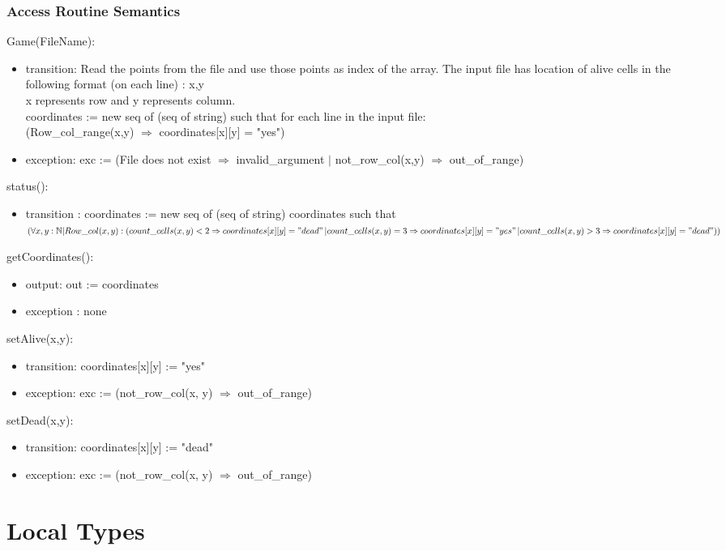 \documentclass[12pt]{article}
\begin{document}
\subsubsection* {Access Routine Semantics}
Game(FileName):
\begin{itemize}
    \item transition: Read the points from the file and use those points as index of the array. The input file has location of alive cells in the following format (on each line) : x,y \\x represents row and y represents column.\\
    coordinates := new seq of (seq of string) such that for each line in the input file:\\
(Row\_col\_range(x,y) $\Rightarrow$ coordinates[x][y] = "yes")\\
    \item exception: exc := (File does not exist $\Rightarrow$ invalid\_argument $|$ not\_row\_col(x,y) $\Rightarrow$ out\_of\_range)
\end{itemize}
status():
\begin{itemize}
    \item transition : coordinates := new seq of (seq of string) coordinates such that $(\forall x, y : \mathbb{N} | Row\_col(x,y) : (count\_cells(x,y) < 2 \Rightarrow coordinates[x][y] = "dead" \,| count\_cells(x,y) = 3 \Rightarrow coordinates[x][y] = "yes" \,| count\_cells(x,y) > 3 \Rightarrow coordinates[x][y] = "dead"))$
\end{itemize}
getCoordinates():
\begin{itemize}
    \item output: out := coordinates
    \item exception : none
\end{itemize}
setAlive(x,y):
\begin{itemize}
    \item transition: coordinates[x][y] := "yes" 
    \item exception: exc := (not\_row\_col(x, y) $\Rightarrow$ out\_of\_range)
\end{itemize}
setDead(x,y):
\begin{itemize}
    \item transition: coordinates[x][y] := "dead"
    \item exception: exc := (not\_row\_col(x, y) $\Rightarrow$ out\_of\_range)
\end{itemize}
\newpage

\section* {Local Types}
\end{document}
